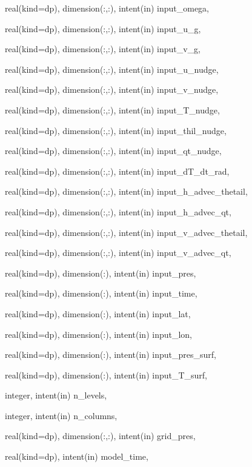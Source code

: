 {\begin{DoxyParamCaption}
\item[{real(kind=dp), dimension(\+:,\+:), intent(in)}]{input\+\_\+omega, }
\item[{real(kind=dp), dimension(\+:,\+:), intent(in)}]{input\+\_\+u\+\_\+g, }
\item[{real(kind=dp), dimension(\+:,\+:), intent(in)}]{input\+\_\+v\+\_\+g, }
\item[{real(kind=dp), dimension(\+:,\+:), intent(in)}]{input\+\_\+u\+\_\+nudge, }
\item[{real(kind=dp), dimension(\+:,\+:), intent(in)}]{input\+\_\+v\+\_\+nudge, }
\item[{real(kind=dp), dimension(\+:,\+:), intent(in)}]{input\+\_\+\+T\+\_\+nudge, }
\item[{real(kind=dp), dimension(\+:,\+:), intent(in)}]{input\+\_\+thil\+\_\+nudge, }
\item[{real(kind=dp), dimension(\+:,\+:), intent(in)}]{input\+\_\+qt\+\_\+nudge, }
\item[{real(kind=dp), dimension(\+:,\+:), intent(in)}]{input\+\_\+d\+T\+\_\+dt\+\_\+rad, }
\item[{real(kind=dp), dimension(\+:,\+:), intent(in)}]{input\+\_\+h\+\_\+advec\+\_\+thetail, }
\item[{real(kind=dp), dimension(\+:,\+:), intent(in)}]{input\+\_\+h\+\_\+advec\+\_\+qt, }
\item[{real(kind=dp), dimension(\+:,\+:), intent(in)}]{input\+\_\+v\+\_\+advec\+\_\+thetail, }
\item[{real(kind=dp), dimension(\+:,\+:), intent(in)}]{input\+\_\+v\+\_\+advec\+\_\+qt, }
\item[{real(kind=dp), dimension(\+:), intent(in)}]{input\+\_\+pres, }
\item[{real(kind=dp), dimension(\+:), intent(in)}]{input\+\_\+time, }
\item[{real(kind=dp), dimension(\+:), intent(in)}]{input\+\_\+lat, }
\item[{real(kind=dp), dimension(\+:), intent(in)}]{input\+\_\+lon, }
\item[{real(kind=dp), dimension(\+:), intent(in)}]{input\+\_\+pres\+\_\+surf, }
\item[{real(kind=dp), dimension(\+:), intent(in)}]{input\+\_\+\+T\+\_\+surf, }
\item[{integer, intent(in)}]{n\+\_\+levels, }
\item[{integer, intent(in)}]{n\+\_\+columns, }
\item[{real(kind=dp), dimension(\+:,\+:), intent(in)}]{grid\+\_\+pres, }
\item[{real(kind=dp), intent(in)}]{model\+\_\+time, }

\end{DoxyParamCaption}}
